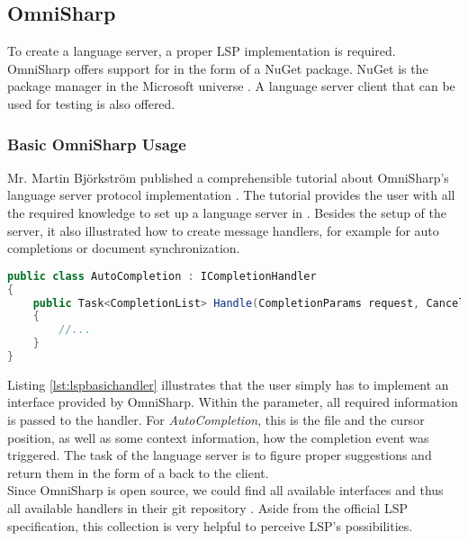 \subsection{OmniSharp}
\label{section:analysis:omnisharp}
To create a language server, a proper LSP implementation is required.
OmniSharp offers support for \CsharpWithSpace \cite{langserverdotorg} in the form of a NuGet package. 
NuGet is the package manager in the Microsoft universe \cite{nuget}.
A language server client that can be used for testing is also offered.

\subsubsection{Basic OmniSharp Usage}
Mr. Martin Bj\"orkstr\"om published a comprehensible tutorial about OmniSharp's language server protocol implementation \cite{omnisharptutorial}. 
The tutorial provides the user with all the required knowledge to set up a language server in \Csharp.
Besides the setup of the server, it also illustrated how to create message handlers, for example for auto completions or document synchronization.\\

\begin{lstlisting}[language=csharp, caption={LSP Handler Implementation}, captionpos=b, label={lst:lspbasichandler}]
public class AutoCompletion : ICompletionHandler
{
    public Task<CompletionList> Handle(CompletionParams request, CancellationToken cancellationToken)
    {
        //...
    }
}
\end{lstlisting}

Listing \ref{lst:lspbasichandler} illustrates that the user simply has to implement an interface provided by OmniSharp.
Within the  parameter, all required information is passed to the handler.
For \textit{AutoCompletion}, this is the file and the cursor position, as well as some context information, how the completion event was triggered.
The task of the language server is to figure proper suggestions and return them in the form of a  back to the client.\\

Since OmniSharp is open source, we could find all available interfaces and thus all available handlers in their git repository \cite{omnisharpgit}.
Aside from the official LSP specification, this collection is very helpful to perceive LSP's possibilities.

